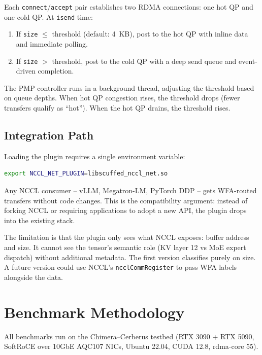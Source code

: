 \documentclass[11pt,letterpaper]{article}
\begin{document}
Each \texttt{connect}/\texttt{accept} pair establishes two RDMA connections: one hot QP and one cold QP. At \texttt{isend} time:

\begin{enumerate}
\item If \texttt{size} $\leq$ threshold (default: 4~KB), post to the hot QP with inline data and immediate polling.
\item If \texttt{size} $>$ threshold, post to the cold QP with a deep send queue and event-driven completion.
\end{enumerate}

The PMP controller runs in a background thread, adjusting the threshold based on queue depths. When hot QP congestion rises, the threshold drops (fewer transfers qualify as ``hot''). When the hot QP drains, the threshold rises.

\subsection{Integration Path}

Loading the plugin requires a single environment variable:

\begin{lstlisting}[language=bash]
export NCCL_NET_PLUGIN=libscuffed_nccl_net.so
\end{lstlisting}

Any NCCL consumer -- vLLM, Megatron-LM, PyTorch DDP -- gets WFA-routed transfers without code changes. This is the compatibility argument: instead of forking NCCL or requiring applications to adopt a new API, the plugin drops into the existing stack.

The limitation is that the plugin only sees what NCCL exposes: buffer address and size. It cannot see the tensor's semantic role (KV layer 12 vs MoE expert dispatch) without additional metadata. The first version classifies purely on size. A future version could use NCCL's \texttt{ncclCommRegister} to pass WFA labels alongside the data.

\section{Benchmark Methodology}
\label{sec:methodology}

All benchmarks run on the Chimera--Cerberus testbed (RTX 3090 + RTX 5090, SoftRoCE over 10GbE AQC107 NICs, Ubuntu 22.04, CUDA 12.8, rdma-core 55).
\end{document}
